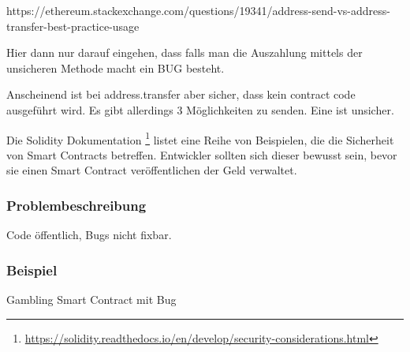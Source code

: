 https://ethereum.stackexchange.com/questions/19341/address-send-vs-address-transfer-best-practice-usage

Hier dann nur darauf eingehen, dass falls man die Auszahlung mittels der unsicheren Methode macht ein BUG besteht. 

Anscheinend ist bei address.transfer aber sicher, dass kein contract code ausgeführt wird. Es gibt allerdings 3 Möglichkeiten zu senden.
Eine ist unsicher.



Die Solidity Dokumentation \footnote{\url{https://solidity.readthedocs.io/en/develop/security-considerations.html}} listet eine Reihe von Beispielen, die die Sicherheit von Smart Contracts betreffen. Entwickler sollten sich dieser bewusst sein, bevor sie einen Smart Contract veröffentlichen der Geld verwaltet.

\subsubsection{Problembeschreibung}
Code öffentlich, Bugs nicht fixbar.
\subsubsection{Beispiel}
Gambling Smart Contract mit Bug